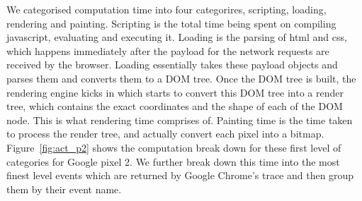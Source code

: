 We categorised computation time into four categorires, scripting,
loading, rendering and painting. Scripting is the total time being
spent on compiling javascript, evaluating and executing it. Loading is
the parsing of html and css, which happens immediately after the
payload for the network requests are received by the browser. Loading
essentially takes these payload objects and parses them and converts
them to a DOM tree. Once the DOM tree is built, the rendering engine
kicks in which starts to convert this DOM tree into a render tree,
which contains the exact coordinates and the shape of each of the DOM
node. This is what rendering time comprises of.  Painting time is the
time taken to process the render tree, and actually convert each pixel
into a bitmap.  Figure~\ref{fig:act_p2} shows the computation break
down for these first level of categories for Google pixel 2. We
further break down this time into the most finest level events which
are returned by Google Chrome's trace and then group them by their
event name.

